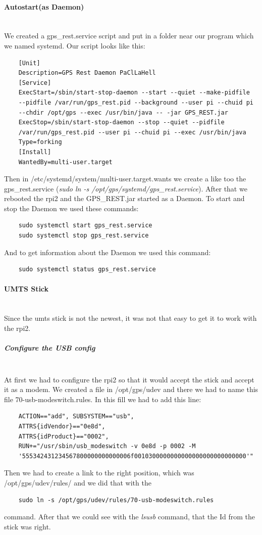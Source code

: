 \paragraph{Autostart(as Daemon)} \mbox{}\\
We created a gps\_rest.service script and put in a folder near our program which we named systemd. Our script looks like this:
\begin{verbatim}
	[Unit]
	Description=GPS Rest Daemon PaClLaHell
	[Service]
	ExecStart=/sbin/start-stop-daemon --start --quiet --make-pidfile 
	--pidfile /var/run/gps_rest.pid --background --user pi --chuid pi 
	--chdir /opt/gps --exec /usr/bin/java -- -jar GPS_REST.jar
	ExecStop=/sbin/start-stop-daemon --stop --quiet --pidfile 
	/var/run/gps_rest.pid --user pi --chuid pi --exec /usr/bin/java
	Type=forking
	[Install]
	WantedBy=multi-user.target
\end{verbatim}
Then in /etc/systemd/system/multi-user.target.wants we create a like too the gps\_rest.service (\textit{sudo ln -s /opt/gps/systemd/gps\_rest.service}).
After that we rebooted the \gls{rpi2} and the GPS\_REST.jar started as a Daemon.
To start and stop the Daemon we used these commands:
\begin{verbatim}
	sudo systemctl start gps_rest.service
	sudo systemctl stop gps_rest.service
\end{verbatim}
And to get information about the Daemon we used this command:
\begin{verbatim}
	sudo systemctl status gps_rest.service
\end{verbatim}

\paragraph{UMTS Stick} \mbox{}\\
Since the \gls{umts} stick is not the newest, it was not that easy to get it to work with the \gls{rpi2}.
\subparagraph{Configure the USB config} \mbox{}\\
At first we had to configure the \gls{rpi2} so that it would accept the stick and accept it as a modem.\newline
We created a file in /opt/gps/udev and there we had to name this file 70-usb-modeswitch.rules. In this fill we had to add this line:
\begin{verbatim}
	ACTION=="add", SUBSYSTEM=="usb", 
	ATTRS{idVendor}=="0e8d", 
	ATTRS{idProduct}=="0002", 
	RUN+="/usr/sbin/usb_modeswitch -v 0e8d -p 0002 -M 
	'555342431234567800000000000006f0010300000000000000000000000000'"
\end{verbatim}
Then we had to create a link to the right position, which was /opt/gps/udev/rules/ and we did that with the 
\begin{verbatim}
	sudo ln -s /opt/gps/udev/rules/70-usb-modeswitch.rules
\end{verbatim}
command.\newline
After that we could see with the \textit{lsusb} command, that the Id from the stick was right.

